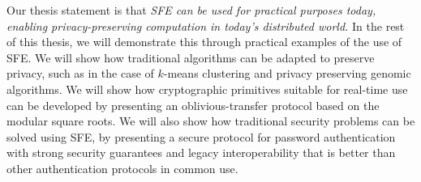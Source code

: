 Our thesis statement is that {\it SFE can be used for practical purposes today,
enabling privacy-preserving computation in today's distributed
world. } In the rest of this thesis, we will demonstrate this through
practical examples of the use of SFE.  We will show how traditional algorithms
can be adapted to preserve privacy, such as in the case of $k$-means clustering
and privacy preserving genomic algorithms.  We will show how cryptographic
primitives suitable for real-time use can be developed by presenting an
oblivious-transfer protocol based on the modular square roots.  We will
also show how traditional security problems can be solved using SFE,
by presenting a secure protocol for password authentication with strong
security guarantees and legacy interoperability that is better than other
authentication protocols in common use.

